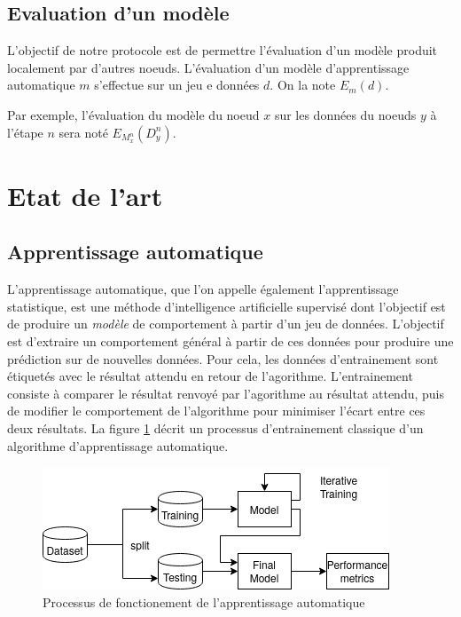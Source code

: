 \documentclass[stage3a]{tnreport} %
\begin{document}
\subsection{Evaluation d'un modèle}

L'objectif de notre protocole est de permettre l'évaluation d'un modèle produit localement par d'autres noeuds. L'évaluation d'un modèle d'apprentissage automatique $m$ s'effectue sur un jeu e données $d$. On la note $E_m(d)$. 

Par exemple, l'évaluation du modèle du noeud $x$ sur les données du noeuds $y$ à l'étape $n$ sera noté $E_{M_x^n}(D_y^n)$.


\section{Etat de l'art}

\subsection{Apprentissage automatique}

L'apprentissage automatique, que l'on appelle également l'apprentissage statistique, est une méthode d'intelligence artificielle supervisé dont l'objectif est de produire un \textit{modèle} de comportement à partir d'un jeu de données. L'objectif est d'extraire un comportement général à partir de ces données pour produire une prédiction sur de nouvelles données. Pour cela, les données d'entrainement sont étiquetés avec le résultat attendu en retour de l'agorithme. L'entrainement consiste à comparer le résultat renvoyé par l'agorithme au résultat attendu, puis de modifier le comportement de l'algorithme pour minimiser l'écart entre ces deux résultats. La figure \ref{fig:machine_learning_workflow} décrit un processus d'entrainement classique d'un algorithme d'apprentissage automatique.


\begin{figure}[]
  \centering
  \includegraphics[scale=0.8]{figures/machine_workflow.png}
  \caption{Processus de fonctionement de l'apprentissage automatique}
  \label{fig:machine_learning_workflow}
\end{figure}
\end{document}
